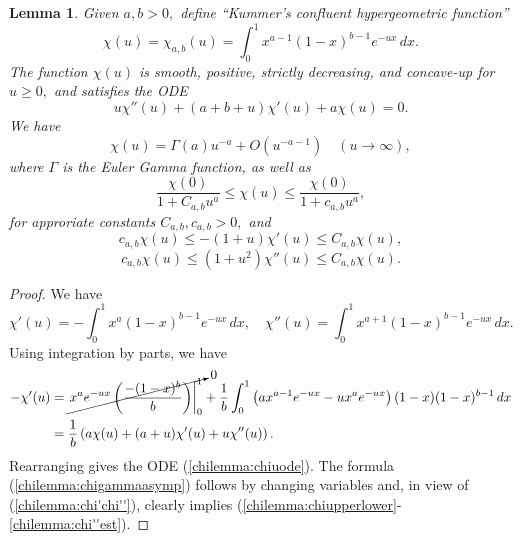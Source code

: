 \documentclass[12pt]{amsart}
\renewcommand{\1}{{\mathbf 1}}
\newtheorem{lemma}[thm]{Lemma}
\theoremstyle{others}
\numberwithin{equation}{section}
\begin{document}
\begin{lemma}\label{lemma:chilemma} Given $a, b > 0,$ define ``Kummer's confluent hypergeometric function''
$$\chi(u) = \chi_{a,b}(u) = \int_0^1 x^{a-1} (1 - x)^{b-1} e^{-ux} \, dx.$$
The function $\chi(u)$ is smooth, positive, strictly decreasing, and concave-up for $u \geq 0,$ and satisfies the ODE
\begin{equation}\label{chilemma:chiuode}
u \chi''(u) + \left(a + b + u\right) \chi'(u) + a \chi(u) = 0.
\end{equation}
We have
\begin{equation}\label{chilemma:chigammaasymp}
\chi(u) = %
\Gamma(a) u^{-a} + O(u^{-a-1}) \quad (u \to \infty),
\end{equation}
where $\Gamma$ is the Euler Gamma function, as well as
\begin{equation}\label{chilemma:chiupperlower}
\frac{\chi(0)}{1 + C_{a,b} u^{a}} \leq \chi(u) \leq \frac{\chi(0)}{1 + c_{a,b} u^{a}},
\end{equation}
for approriate constants $C_{a,b}, c_{a,b} > 0,$ and
\begin{equation}\label{chilemma:chi'est}
c_{a,b} \chi(u) \leq -(1 + u) \chi'(u) \leq C_{a,b} \chi(u),
\end{equation}
\begin{equation}\label{chilemma:chi''est}
c_{a,b} \chi(u) \leq (1 + u^2) \chi''(u) \leq C_{a,b} \chi(u).
\end{equation}
\end{lemma}
\begin{proof}
We have
\begin{equation}\label{chilemma:chi'chi''}
\chi'(u) = -\int_0^1 x^{a} (1 - x)^{b-1} e^{-ux} \, dx, \quad \chi''(u) = \int_0^1 x^{a + 1} (1 - x)^{b-1} e^{-ux} \, dx.
\end{equation}
Using integration by parts, we have
\begin{equation*}
\begin{split}
-\chi'(u) & = \cancelto{0}{\left. x^{a} e^{-ux} \left( \frac{-(1-x)^{b}}{b} \right) \right|_0^1} + \frac{1}{b}\int_0^1 \left( a x^{a-1} e^{-ux} - ux^{a} e^{-ux} \right) (1 - x) (1 - x)^{b-1} \, dx \\
& =\frac{1}{b} \left( a \chi(u) + (a + u) \chi'(u) + u \chi''(u) \right).
\end{split}
\end{equation*}
Rearranging gives the ODE (\ref{chilemma:chiuode}). The formula (\ref{chilemma:chigammaasymp}) follows by changing variables and, in view of (\ref{chilemma:chi'chi''}), clearly implies (\ref{chilemma:chiupperlower}-\ref{chilemma:chi''est}).
\end{proof}
\end{document}
